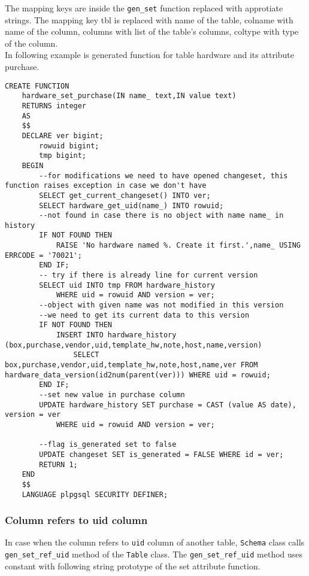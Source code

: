 \documentclass[deska]{subfiles}
\begin{document}
The mapping keys are inside the {\tt gen\_set} function replaced with approtiate strings. The mapping key tbl is replaced with name of the table, colname with name of the column, columns with list of the table's columns, coltype with type of the column.\\
In following example is generated function for table hardware and its attribute purchase.

\begin{verbatim}
CREATE FUNCTION
    hardware_set_purchase(IN name_ text,IN value text)
    RETURNS integer
    AS
    $$
    DECLARE ver bigint;
        rowuid bigint;
        tmp bigint;
    BEGIN
        --for modifications we need to have opened changeset, this function raises exception in case we don't have
        SELECT get_current_changeset() INTO ver;
        SELECT hardware_get_uid(name_) INTO rowuid;
        --not found in case there is no object with name name_ in history
        IF NOT FOUND THEN
            RAISE 'No hardware named %. Create it first.',name_ USING ERRCODE = '70021';
        END IF;
        -- try if there is already line for current version
        SELECT uid INTO tmp FROM hardware_history
            WHERE uid = rowuid AND version = ver;
        --object with given name was not modified in this version
        --we need to get its current data to this version
        IF NOT FOUND THEN
            INSERT INTO hardware_history (box,purchase,vendor,uid,template_hw,note,host,name,version)
                SELECT box,purchase,vendor,uid,template_hw,note,host,name,ver FROM hardware_data_version(id2num(parent(ver))) WHERE uid = rowuid;
        END IF;
        --set new value in purchase column
        UPDATE hardware_history SET purchase = CAST (value AS date), version = ver
            WHERE uid = rowuid AND version = ver;

        --flag is_generated set to false
        UPDATE changeset SET is_generated = FALSE WHERE id = ver;
        RETURN 1;
    END
    $$
    LANGUAGE plpgsql SECURITY DEFINER;

\end{verbatim}

\subsubsection{Column refers to uid column}
In case when the column refers to {\tt uid} column of another table, {\tt Schema} class calls {\tt gen\_set\_ref\_uid} method of the {\tt Table} class. The {\tt gen\_set\_ref\_uid} method uses constant with following string prototype of the set attribute function.
\end{document}
